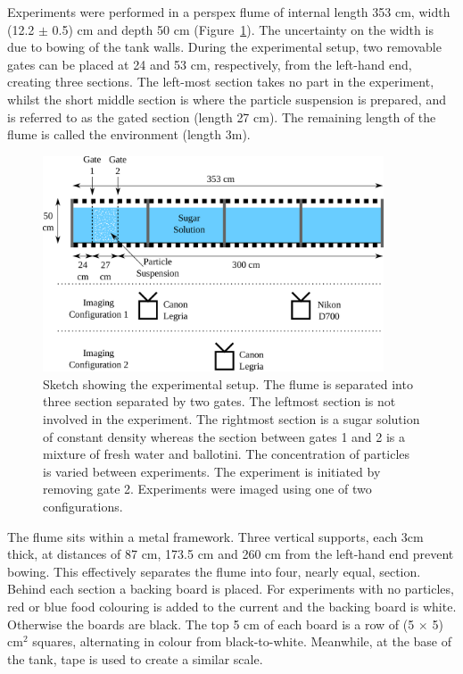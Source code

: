 \documentclass[authoryear,preprint,review,12pt]{elsarticle}
\begin{document}
Experiments were performed in a perspex flume of internal length 353 cm, width (12.2 $\pm$ 0.5) cm and depth 50 cm (Figure~\ref{fig:setup}). The uncertainty on the width is due to bowing of the tank walls. During the experimental setup, two removable gates can be placed at 24 and 53 cm, respectively, from the left-hand end, creating three sections. The left-most section takes no part in the experiment, whilst the short middle section is where the particle suspension is prepared, and is referred to as the gated section (length 27 cm). The remaining length of the flume is called the environment (length 3m).

\begin{figure}[ht!]
  \centerline{\includegraphics[width=0.9\textwidth]{setup.pdf}}
  \caption{Sketch showing the experimental setup. The flume is separated into three section separated by two gates. The leftmost section is not involved in the experiment. The rightmost section is a sugar solution of constant density whereas the section between gates 1 and 2 is a mixture of fresh water and ballotini. The concentration of particles is varied between experiments. The experiment is initiated by removing gate 2. Experiments were imaged using one of two configurations. }
  \label{fig:setup}
\end{figure}

The flume sits within a metal framework. Three vertical supports, each 3cm thick, at distances of 87 cm, 173.5 cm and 260 cm from the left-hand end prevent bowing. This effectively separates the flume into four, nearly equal, section. Behind each section a backing board is placed. For experiments with no particles, red or blue food colouring is added to the current and the backing board is white. Otherwise the boards are black. The top 5 cm of each board is a row of (5 $\times$ 5) cm$^{2}$ squares, alternating in colour from black-to-white. Meanwhile, at the base of the tank, tape is used to create a similar scale.
\end{document}
